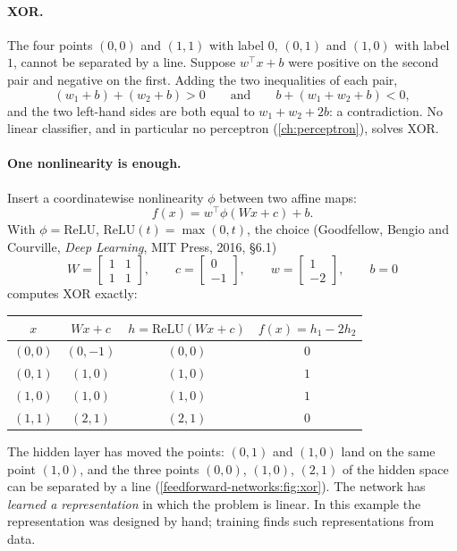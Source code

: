 \begin{notechapter}
\paragraph{XOR.} The four points $(0,0)$ and $(1,1)$ with label $0$, $(0,1)$ and $(1,0)$ with
label $1$, cannot be separated by a line. Suppose $w^\top x + b$ were positive on the second pair
and negative on the first. Adding the two inequalities of each pair,
\[
  (w_1 + b) + (w_2 + b) > 0\qquad\text{and}\qquad b + (w_1 + w_2 + b) < 0,
\]
and the two left-hand sides are both equal to $w_1 + w_2 + 2b$: a contradiction. No linear
classifier, and in particular no perceptron (\cref{ch:perceptron}), solves XOR.

\paragraph{One nonlinearity is enough.} Insert a coordinatewise nonlinearity
$\phi$ between two affine maps:
\[
  f(x) = w^\top\phi(Wx + c) + b .
\]
With $\phi = \mathrm{ReLU}$, $\mathrm{ReLU}(t) = \max(0, t)$, the choice (Goodfellow, Bengio and Courville,
\emph{Deep Learning}, MIT Press, 2016, §6.1)
\[
  W = \begin{bmatrix}1&1\\1&1\end{bmatrix},\qquad c = \begin{bmatrix}0\\-1\end{bmatrix},\qquad
  w = \begin{bmatrix}1\\-2\end{bmatrix},\qquad b = 0
\]
computes XOR exactly:

\begin{center}
\begin{tabular}{cccc}
\toprule
$x$ & $Wx + c$ & $h = \mathrm{ReLU}(Wx + c)$ & $f(x) = h_1 - 2h_2$ \\
\midrule
$(0,0)$ & $(0,-1)$ & $(0,0)$ & $0$ \\
$(0,1)$ & $(1,0)$ & $(1,0)$ & $1$ \\
$(1,0)$ & $(1,0)$ & $(1,0)$ & $1$ \\
$(1,1)$ & $(2,1)$ & $(2,1)$ & $0$ \\
\bottomrule
\end{tabular}
\end{center}

The hidden layer has moved the points: $(0,1)$ and $(1,0)$ land on the same point $(1,0)$, and
the three points $(0,0)$, $(1,0)$, $(2,1)$ of the hidden space can be separated by a line
(\cref{feedforward-networks:fig:xor}). The network has \emph{learned a representation} in
which the problem is linear. In this example the representation was designed by hand;
training finds such representations from data.


\end{notechapter}
